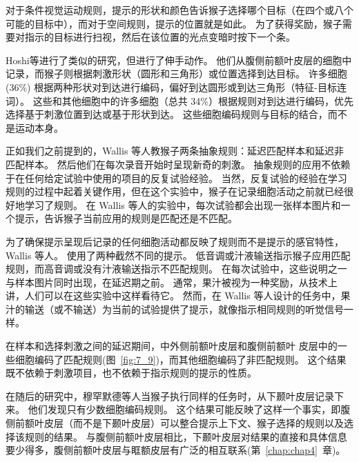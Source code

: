 对于条件视觉运动规则，提示的形状和颜色告诉猴子选择哪个目标（在四个或八个可能的目标中），而对于空间规则，提示的位置就是如此。 
为了获得奖励，猴子需要对指示的目标进行扫视，然后在该位置的光点变暗时按下一个条。
\par


Hoshi等\cite{hoshi1998task}进行了类似的研究，但进行了伸手动作。 
他们从腹侧前额叶皮层的细胞中记录，而猴子则根据刺激形状（圆形和三角形）或位置选择到达目标。
许多细胞 (36\%) 根据两种形状对到达进行编码，偏好到达圆形或到达三角形（特征-目标连词）。
这些和其他细胞中的许多细胞（总共 34\%）根据规则对到达进行编码，优先选择基于刺激位置到达或基于形状到达。 
这些细胞编码规则与目标的结合，而不是运动本身。
\par


正如我们之前提到的，Wallis 等人\cite{wallis2001single}教猴子两条抽象规则：延迟匹配样本和延迟非匹配样本。 
然后他们在每次录音开始时呈现新奇的刺激。 抽象规则的应用不依赖于在任何给定试验中使用的项目的反复试验经验。 
当然，反复试验的经验在学习规则的过程中起着关键作用，但在这个实验中，猴子在记录细胞活动之前就已经很好地学习了规则。 
在 Wallis 等人的实验中，每次试验都会出现一张样本图片和一个提示，告诉猴子当前应用的规则是匹配还是不匹配。
\par


为了确保提示呈现后记录的任何细胞活动都反映了规则而不是提示的感官特性，Wallis 等人。
使用了两种截然不同的提示。
低音调或汁液输送指示猴子应用匹配规则，而高音调或没有汁液输送指示不匹配规则。
在每次试验中，这些说明之一与样本图片同时出现，在延迟期之前。 
通常，果汁被视为一种奖励，从技术上讲，人们可以在这些实验中这样看待它。
然而，在 Wallis 等人设计的任务中，果汁的输送（或不输送）为当前的试验提供了提示，就像指示相同规则的听觉信号一样。
\par


在样本和选择刺激之间的延迟期间，中外侧前额叶皮层和腹侧前额叶 皮层中的一些细胞编码了匹配规则(图~\ref{fig:7_9})，而其他细胞编码了非匹配规则。 
这个结果既不依赖于刺激项目，也不依赖于指示规则的提示的性质\cite{wallis2001single}。
\par


在随后的研究中，穆罕默德等人\cite{muhammad2006comparison}当猴子执行同样的任务时，从下颞叶皮层记录下来。 
他们发现只有少数细胞编码规则。
这个结果可能反映了这样一个事实，即腹侧前额叶皮层（而不是下颞叶皮层）可以整合提示上下文、猴子选择的规则以及选择该规则的结果。
与腹侧前额叶皮层相比，下颞叶皮层对结果的直接和具体信息要少得多，腹侧前额叶皮层与眶额皮层有广泛的相互联系(第~\ref{chap:chap4}~章)。



